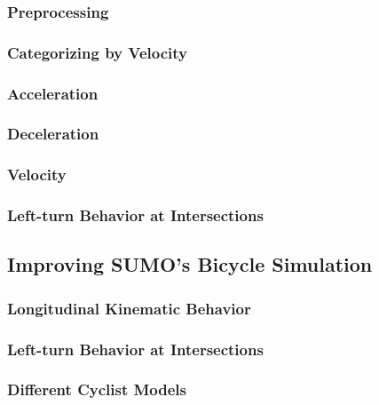 \subsubsection{Preprocessing}
\label{sec:preprocessing_sumo}

\subsubsection{Categorizing by Velocity}
\label{sec:categorizing_by_velocity}

\subsubsection{Acceleration}
\label{sec:acceleration}

\subsubsection{Deceleration}
\label{sec:deceleration}

\subsubsection{Velocity}
\label{sec:velocity}

\subsubsection{Left-turn Behavior at Intersections}
\label{sec:left-turn_behavior_at_intersections}


\subsection{Improving SUMO's Bicycle Simulation}
\label{sec:improving_sumos_bicycle_simulation}


\subsubsection{Longitudinal Kinematic Behavior}
\label{sec:longitudinal_kinematic_behavior}

\subsubsection{Left-turn Behavior at Intersections}
\label{sec:left-turn_behavior_at_intersections}

\subsubsection{Different Cyclist Models}
\label{sec:left-turn_behavior_at_intersections}


